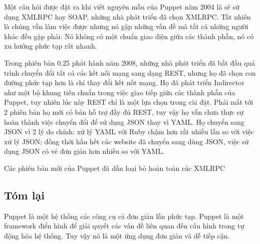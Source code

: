 Một câu hỏi được đặt ra khi viết nguyên mẫu của Puppet năm 2004 là sẽ sử dụng XMLRPC hay SOAP, những nhà phát triển đã chọn XMLRPC. Tất nhiên là chúng vẫn làm việc được nhưng nó gặp những vấn đề mà tất cả những người khác đều gặp phải: Nó không có một chuẩn giao diện giữa các thành phần, nó có xu hướng phức tạp rất nhanh.

Trong phiên bản 0.25 phát hành năm 2008, những nhà phát triển đã bắt đầu quá trình chuyển đổi tất cả các kết nối mạng sang dạng REST, nhưng họ đã chọn con đường phức tạp hơn là chỉ thay đổi kết nốt mạng. Họ đã phát triển Indirector như một bộ khung tiêu chuẩn trong việc giao tiếp giữa các thành phần của Puppet, tuy nhiên lúc này REST chỉ là một lựa chọn trong cài đặt. Phải mất tới 2 phiên bản họ mới có bản hỗ trợ đầy đủ REST, tuy vậy họ vẫn chưa thực sự hoàn thành việc chuyển đổi để sử dụng JSON thay vì YAML. Họ chuyển sang JSON vì 2 lý do chính: xử lý YAML với Ruby chậm hơn rất nhiều lần so với việc xử lý JSON; đồng thời hầu hết các website đã chuyển sang dùng JSON, việc sử dụng JSON có vẻ đơn giản hơn nhiều so với YAML.

Các phiên bản mới của Puppet đã dần loại bỏ hoàn toàn các XMLRPC


\subsection*{Tóm lại}

Puppet là một hệ thống các công cụ cả đơn giản lẫn phức tạp. Puppet là một framework điển hình để giải quyết các vấn đề liên quan đến cấu hình trong tự động hóa hệ thống. Tuy vậy nó là một ứng dụng đơn giản và dễ tiếp cận.
